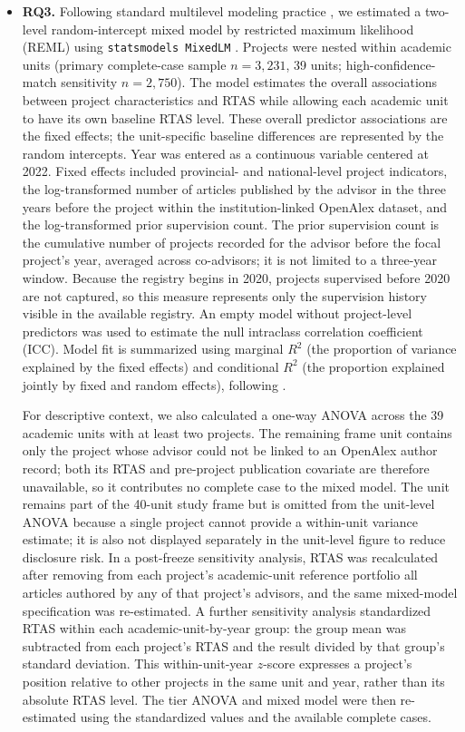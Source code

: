 \documentclass[pdflatex,sn-apa]{sn-jnl}
\begin{document}
\begin{itemize}
\item \textbf{RQ3.} Following standard multilevel modeling practice \citep{snijders2012multilevel}, we estimated a two-level random-intercept mixed model by restricted maximum likelihood (REML) using \texttt{statsmodels MixedLM} \citep{seabold2010statsmodels}. Projects were nested within academic units (primary complete-case sample $n=3,231$, 39 units; high-confidence-match sensitivity $n=2,750$). The model estimates the overall associations between project characteristics and RTAS while allowing each academic unit to have its own baseline RTAS level. These overall predictor associations are the fixed effects; the unit-specific baseline differences are represented by the random intercepts. Year was entered as a continuous variable centered at 2022. Fixed effects included provincial- and national-level project indicators, the log-transformed number of articles published by the advisor in the three years before the project within the institution-linked OpenAlex dataset, and the log-transformed prior supervision count. The prior supervision count is the cumulative number of projects recorded for the advisor before the focal project's year, averaged across co-advisors; it is not limited to a three-year window. Because the registry begins in 2020, projects supervised before 2020 are not captured, so this measure represents only the supervision history visible in the available registry. An empty model without project-level predictors was used to estimate the null intraclass correlation coefficient (ICC). Model fit is summarized using marginal $R^2$ (the proportion of variance explained by the fixed effects) and conditional $R^2$ (the proportion explained jointly by fixed and random effects), following \citet{nakagawa2017r2}.

For descriptive context, we also calculated a one-way ANOVA across the 39 academic units with at least two projects. The remaining frame unit contains only the project whose advisor could not be linked to an OpenAlex author record; both its RTAS and pre-project publication covariate are therefore unavailable, so it contributes no complete case to the mixed model. The unit remains part of the 40-unit study frame but is omitted from the unit-level ANOVA because a single project cannot provide a within-unit variance estimate; it is also not displayed separately in the unit-level figure to reduce disclosure risk. In a post-freeze sensitivity analysis, RTAS was recalculated after removing from each project's academic-unit reference portfolio all articles authored by any of that project's advisors, and the same mixed-model specification was re-estimated. A further sensitivity analysis standardized RTAS within each academic-unit-by-year group: the group mean was subtracted from each project's RTAS and the result divided by that group's standard deviation. This within-unit-year $z$-score expresses a project's position relative to other projects in the same unit and year, rather than its absolute RTAS level. The tier ANOVA and mixed model were then re-estimated using the standardized values and the available complete cases.


\end{itemize}
\end{document}
